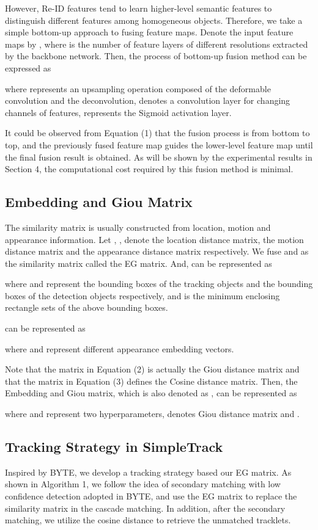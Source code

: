\documentclass[runningheads]{llncs}
\begin{document}
However, Re-ID features tend to learn higher-level semantic features to distinguish different features among homogeneous objects. Therefore, we take a simple bottom-up approach to fusing feature maps. Denote the input feature maps by , where  is the number of feature layers of different resolutions extracted by the backbone network. Then, the process of bottom-up fusion method can be expressed as

where  represents an upsampling operation composed of the deformable convolution and the deconvolution,  denotes a  convolution layer for changing channels of features,  represents the Sigmoid activation layer.

It could be observed from Equation (1) that the fusion process is from bottom to top, and the previously fused feature map guides the lower-level feature map until the final fusion result is obtained. As will be shown by the experimental results in Section 4, the computational cost required by this fusion method is minimal.
\subsection{Embedding and Giou Matrix}
The similarity matrix is usually constructed from location, motion and appearance information. Let , ,  denote  the location distance matrix, the motion distance matrix and the appearance distance matrix respectively. We fuse  and  as the similarity matrix called the EG matrix. And,  can be represented as

where  and  represent the bounding boxes of the tracking objects and the bounding boxes of the detection objects respectively, and  is the minimum enclosing rectangle sets of the above bounding boxes. 

 can be represented as

where  and  represent different appearance embedding vectors.

Note that the matrix  in Equation (2) is actually the Giou distance matrix and that the matrix  in Equation (3) defines the Cosine distance matrix. Then, the Embedding and Giou matrix, which is also denoted as , can be represented as 

where  and  represent two hyperparameters,  denotes Giou distance matrix and .
\subsection{Tracking Strategy in SimpleTrack}
Inspired by BYTE\cite{zhang2021bytetrack}, we develop a tracking strategy based our EG matrix. As shown in Algorithm 1, we follow the idea of secondary matching with low confidence detection adopted in BYTE, and use the EG matrix to replace the similarity matrix in the cascade matching. In addition, after the secondary matching, we utilize the cosine distance to retrieve the unmatched tracklets.
\end{document}
